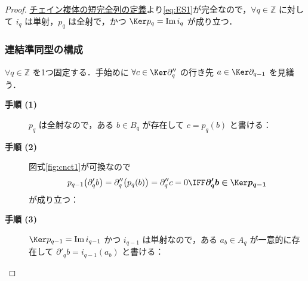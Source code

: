 \documentclass[algtopo_main]{subfiles}
\begin{document}
\begin{proof}
    \hyperref[def:chain-exact]{チェイン複体の短完全列の定義}より\eqref{eq:ES1}が完全なので，$\forall q \in \mathbb{Z}$ に対して $i_q$ は単射，$p_q$ は全射で，かつ $\Ker p_q = \Im i_q$ が成り立つ．

    \subsubsection{連結準同型の構成}

    $\forall q \in \mathbb{Z}$ を1つ固定する．手始めに $\forall c \in \Ker \partial''_q$ の行き先 $a \in \Ker \partial_{q-1}$ を見繕う．
    \begin{description}
        \item[\textbf{手順 (1)}]\label{pro:1}  $p_q$ は全射なので，ある $b \in B_q$ が存在して 
        $c = p_{q}(b)$ と書ける：

        \begin{center}
        \end{center}

        \item[\textbf{手順 (2)}]\label{pro:2} 図式\ref{fig:cnct1}が可換なので
        \begin{align}
            p_{q-1} \bigl(\partial'_q b\bigr) = \partial''_q \bigl( p_q (b) \bigr) = \partial''_q c = 0 \IFF \bm{\partial'_q b \in \Ker p_{q-1}}
        \end{align}
        が成り立つ：

        \begin{center}
        \end{center}


        \item[\textbf{手順 (3)}]\label{pro:3} $\Ker p_{q-1} = \Im i_{q-1}$ かつ $i_{q-1}$ は単射なので，ある $a_b \in A_q$ が一意的に存在して
        $\partial'_q b = i_{q-1} (a_b)$ と書ける：


\end{description}
\end{proof}
\end{document}
